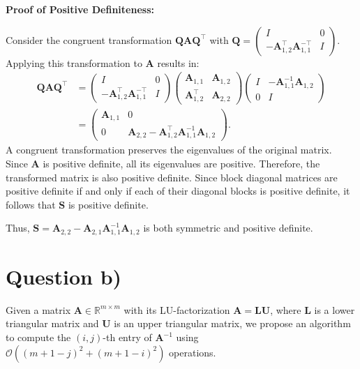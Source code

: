 \documentclass{article}
\begin{document}
\textbf{Proof of Positive Definiteness:}

Consider the congruent transformation $\boldsymbol{Q} \boldsymbol{A} \boldsymbol{Q}^\top$ with $\boldsymbol{Q} = \begin{pmatrix} I & 0 \\ -\boldsymbol{A}_{1,2}^\top \boldsymbol{A}_{1,1}^{-\top} & I \end{pmatrix}$. Applying this transformation to $\boldsymbol{A}$ results in:
\begin{align}
\boldsymbol{Q} \boldsymbol{A} \boldsymbol{Q}^\top &= \begin{pmatrix} I & 0 \\ -\boldsymbol{A}_{1,2}^\top \boldsymbol{A}_{1,1}^{-\top} & I \end{pmatrix}
\begin{pmatrix}
\boldsymbol{A}_{1,1} & \boldsymbol{A}_{1,2} \\
\boldsymbol{A}_{1,2}^\top & \boldsymbol{A}_{2,2}
\end{pmatrix}
\begin{pmatrix} I & -\boldsymbol{A}_{1,1}^{-1} \boldsymbol{A}_{1,2} \\ 0 & I \end{pmatrix} \\
&= \begin{pmatrix}
\boldsymbol{A}_{1,1} & 0 \\
0 & \boldsymbol{A}_{2,2} - \boldsymbol{A}_{1,2}^\top \boldsymbol{A}_{1,1}^{-1} \boldsymbol{A}_{1,2}
\end{pmatrix}.
\end{align}
A congruent transformation preserves the eigenvalues of the original matrix. Since $\boldsymbol{A}$ is positive definite, all its eigenvalues are positive. Therefore, the transformed matrix is also positive definite. Since block diagonal matrices are positive definite if and only if each of their diagonal blocks is positive definite, it follows that $\boldsymbol{S}$ is positive definite.

Thus, $\boldsymbol{S} = \boldsymbol{A}_{2,2} - \boldsymbol{A}_{2,1} \boldsymbol{A}_{1,1}^{-1} \boldsymbol{A}_{1,2}$ is both symmetric and positive definite.
\section{Question b)}
Given a matrix $\boldsymbol{A} \in \mathbb{R}^{m \times m}$ with its LU-factorization $\boldsymbol{A} = \boldsymbol{L} \boldsymbol{U}$, where $\boldsymbol{L}$ is a lower triangular matrix and $\boldsymbol{U}$ is an upper triangular matrix, we propose an algorithm to compute the $(i, j)$-th entry of $\boldsymbol{A}^{-1}$ using $\mathcal{O}\left((m+1-j)^2+(m+1-i)^2\right)$ operations.
\end{document}
